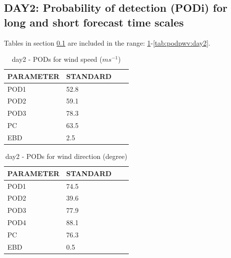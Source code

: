 \subsection{DAY2: Probability of detection (PODi) for long and short forecast time scales}\label{subsec:day2:pod}
Tables in section \ref{subsec:day2:pod} are included in the range: \ref{tab:podws:day2}-\ref{tab:podpwv:day2}.
\begin{table}[h!]
\begin{center}
\begin{tabular}{|l|l|l|l|}
\hline
\multicolumn{1}{|c|}{\cellcolor[HTML]{C0C0C0}\textbf{PARAMETER}} & \multicolumn{1}{c|}{\cellcolor[HTML]{C0C0C0}\textbf{STANDARD}} \\
\hline
\cellcolor[HTML]{C0C0C0}POD1  & 52.8                                \\
\cellcolor[HTML]{C0C0C0}POD2  & 59.1                                \\
\cellcolor[HTML]{C0C0C0}POD3  & 78.3                                \\
\cellcolor[HTML]{C0C0C0}PC    & 63.5                                  \\
\cellcolor[HTML]{C0C0C0}EBD   & 2.5                                 \\
\hline
\end{tabular}
\caption{day2 - PODs for wind speed ($m s^{-1}$)}
\label{tab:podws:day2}
\end{center}
\end{table}
\begin{table}[p!]
\begin{center}
\begin{tabular}{|l|l|l|l|}
\hline
\multicolumn{1}{|c|}{\cellcolor[HTML]{C0C0C0}\textbf{PARAMETER}} & \multicolumn{1}{c|}{\cellcolor[HTML]{C0C0C0}\textbf{STANDARD}}\\
\hline
\cellcolor[HTML]{C0C0C0}POD1  & 74.5      \\
\cellcolor[HTML]{C0C0C0}POD2  & 39.6      \\
\cellcolor[HTML]{C0C0C0}POD3  & 77.9      \\
\cellcolor[HTML]{C0C0C0}POD4  & 88.1      \\
\cellcolor[HTML]{C0C0C0}PC    & 76.3        \\
\cellcolor[HTML]{C0C0C0}EBD   & 0.5       \\
\hline
\end{tabular}
\caption{day2 - PODs for wind direction (degree)}
\label{tab:podwd:day2}
\end{center}
\end{table}
